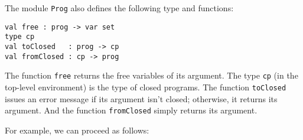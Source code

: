The module \texttt{Prog} also defines the following type and
functions:
\begin{verbatim}
val free : prog -> var set
type cp
val toClosed   : prog -> cp
val fromClosed : cp -> prog
\end{verbatim}
%
%
%
%
The function \texttt{free} returns the free variables of its argument.
The type \texttt{cp} (in the top-level environment) is the type of
closed programs.  The function \texttt{toClosed} issues an error message
if its argument isn't closed; otherwise, it returns its argument.
And the function \texttt{fromClosed} simply returns its argument.

For example, we can proceed as follows:


